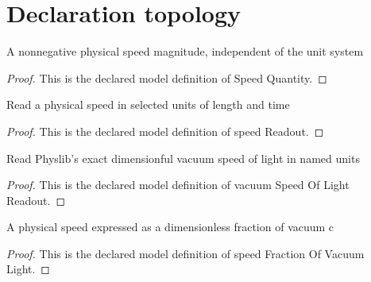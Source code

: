 \section{Declaration topology}
\begin{definition}
  \label{def:physics:phyx-mini-0553:phyxminiproblems-problemphyxmini0553-speedquantity}
  A nonnegative physical speed magnitude, independent of the unit system
\end{definition}
\begin{proof}
  This is the declared model definition of Speed Quantity.
\end{proof}
\begin{definition}
  \label{def:physics:phyx-mini-0553:phyxminiproblems-problemphyxmini0553-speedreadout}
  Read a physical speed in selected units of length and time
\end{definition}
\begin{proof}
  This is the declared model definition of speed Readout.
\end{proof}
\begin{definition}
  \label{def:physics:phyx-mini-0553:phyxminiproblems-problemphyxmini0553-vacuumspeedoflightreadout}
  Read Physlib's exact dimensionful vacuum speed of light in named units
\end{definition}
\begin{proof}
  This is the declared model definition of vacuum Speed Of Light Readout.
\end{proof}
\begin{definition}
  \label{def:physics:phyx-mini-0553:phyxminiproblems-problemphyxmini0553-speedfractionofvacuumlight}
  A physical speed expressed as a dimensionless fraction of vacuum c
\end{definition}
\begin{proof}
  This is the declared model definition of speed Fraction Of Vacuum Light.
\end{proof}
